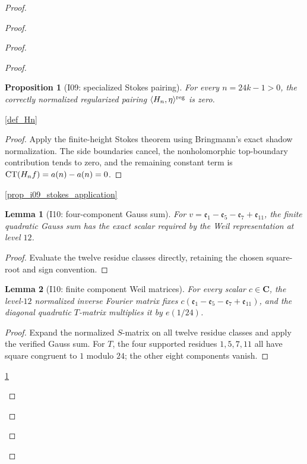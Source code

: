 \documentclass[11pt,a4paper]{article}
\numberwithin{equation}{section}
\theoremstyle{plain}\newtheorem{theorem}{Theorem}[section]\newaliascnt{proposition}{theorem}\newtheorem{proposition}[proposition]{Proposition}\aliascntresetthe{proposition}\newaliascnt{lemma}{theorem}\newtheorem{lemma}[lemma]{Lemma}\aliascntresetthe{lemma}
\theoremstyle{definition}\newaliascnt{definition}{theorem}\newtheorem{definition}[definition]{Definition}\aliascntresetthe{definition}\newaliascnt{notation}{theorem}\newtheorem{notation}[notation]{Notation}\aliascntresetthe{notation}
\providecommand{\lean}[1]{}\providecommand{\leanok}{}
\begin{document}
\begin{proof}
\begin{proof}
\begin{proof}
\begin{proof}
\begin{proposition}[I09: specialized Stokes pairing]\label{prop_i09_pairing_zero}\lean{SptCM.Analytic.Repaired.auxiliaryHn_stokesPairing_eq_zero}\leanok
For every $n=24k-1>0$, the correctly normalized regularized pairing $\langle H_n,\eta\rangle^{\rm reg}$ is zero.
\end{proposition}
\begin{uses-statement}\ref{def_Hn}\end{uses-statement}
\begin{proof}
Apply the finite-height Stokes theorem using Bringmann's exact shadow normalization.  The side boundaries cancel, the nonholomorphic top-boundary contribution tends to zero, and the remaining constant term is $\operatorname{CT}(H_nf)=a(n)-a(n)=0$.
\end{proof}
\begin{uses-proof}\ref{prop_i09_stokes_application}\end{uses-proof}

\begin{lemma}[I10: four-component Gauss sum]\label{lem_i10_gauss_sum}\lean{SptCM.Analytic.Repaired.chiTwelve_gauss_sum}\leanok
For $v=\mathfrak e_1-\mathfrak e_5-\mathfrak e_7+\mathfrak e_{11}$, the finite quadratic Gauss sum has the exact scalar required by the Weil representation at level $12$.
\end{lemma}
\begin{proof}Evaluate the twelve residue classes directly, retaining the chosen square-root and sign convention.\end{proof}

\begin{lemma}[I10: finite component Weil matrices]\label{lem_i10_component_weil_matrices}\lean{SptCM.Analytic.Repaired.fourComponentVector_weil_generators}\leanok
For every scalar $c\in\mathbf C$, the level-$12$ normalized inverse Fourier
matrix fixes $c(\mathfrak e_1-\mathfrak e_5-\mathfrak e_7+\mathfrak e_{11})$,
and the diagonal quadratic $T$-matrix multiplies it by $e(1/24)$.
\end{lemma}
\begin{proof}
Expand the normalized $S$-matrix on all twelve residue classes and apply the
verified Gauss sum.  For $T$, the four supported residues $1,5,7,11$ all have
square congruent to $1$ modulo $24$; the other eight components vanish.
\end{proof}
\begin{uses-proof}\ref{lem_i10_gauss_sum}\end{uses-proof}


\end{proof}
\end{proof}
\end{proof}
\end{proof}
\end{document}

